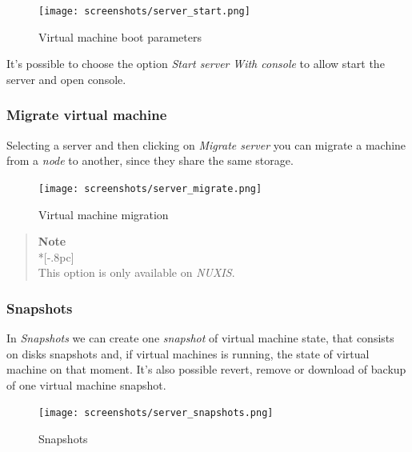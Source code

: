 \begin{figure}[H]
	\begin{center}
	\texttt{[image: screenshots/server\_start.png]}
	\caption{Virtual machine boot parameters}
	\label{fig:server_start}
	\end{center}
\end{figure}

It's possible to choose the option \emph{Start server} \emph{With console} to allow start the server and open console.

\subsubsection{Migrate virtual machine}
\label{sec:migrate_server}

Selecting a server and then clicking on \emph{Migrate server} you can migrate a machine from a \emph{node} to another, since they share the same storage.

\begin{figure}[H]
	\begin{center}
	\texttt{[image: screenshots/server\_migrate.png]}
	\caption{Virtual machine migration}
	\label{fig:server_migrate}
	\end{center}
\end{figure}

\begin{quote}
	{\large \bf Note} \\*[-.8pc]
	\underline{\hspace{6in}} \\
	This option is only available on \emph{NUXIS}.
\end{quote}

\subsubsection{Snapshots}
\label{sec:server_snapshots}

In \emph{Snapshots} we can create one \emph{snapshot} of virtual machine state, that consists on disks snapshots and, if virtual machines is running, the state of virtual machine on that moment.
It's also possible revert, remove or download of backup of one virtual machine snapshot.

\begin{figure}[H]
	\begin{center}
	\texttt{[image: screenshots/server\_snapshots.png]}
	\caption{Snapshots}
	\label{fig:server_snapshots}
	\end{center}
\end{figure}

